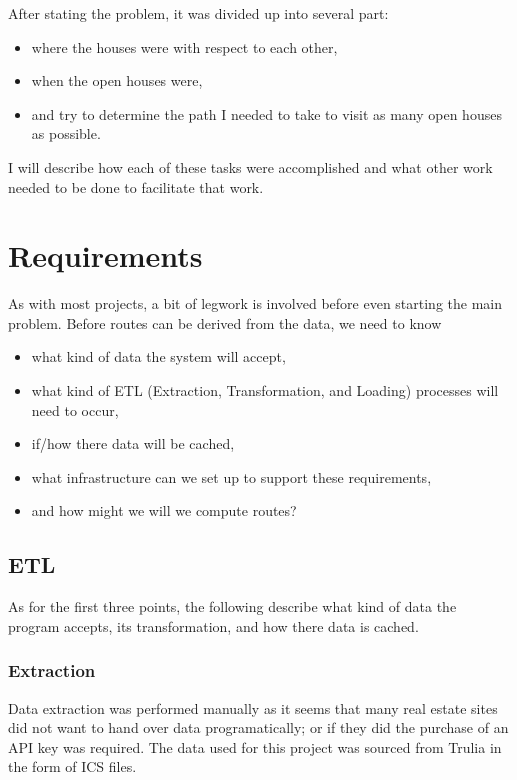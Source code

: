 \documentclass[letterpaper,11pt]{report}
\theoremstyle{definition}
\theoremstyle{definition}
\begin{document}
After stating the problem, it was divided up into several part:
\begin{itemize}
  \item where the houses were with respect to each other,
  \item when the open houses were,
  \item and try to determine the path I needed to take to visit as many open houses as possible.
\end{itemize}

I will describe how each of these tasks were accomplished and what other work needed to be done to facilitate that work.


\section{Requirements}
As with most projects, a bit of legwork is involved before even starting the main problem. Before routes can be derived from the data, we need to know
\begin{itemize}
  \item what kind of data the system will accept,
  \item what kind of ETL (Extraction, Transformation, and Loading) processes will need to occur,
  \item if/how there data will be cached,
  \item what infrastructure can we set up to support these requirements,
  \item and how might we will we compute routes?
\end{itemize}

\subsection{ETL}
As for the first three points, the following describe what kind of data the program accepts, its transformation, and how there data is cached.

\subsubsection{Extraction}\label{E}
Data extraction was performed manually as it seems that many real estate sites did not want to hand over data programatically; or if they did the purchase of an API key was required. The data used for this project was sourced from Trulia\cite{Trulia} in the form of ICS files\cite{ICS}.
\end{document}
